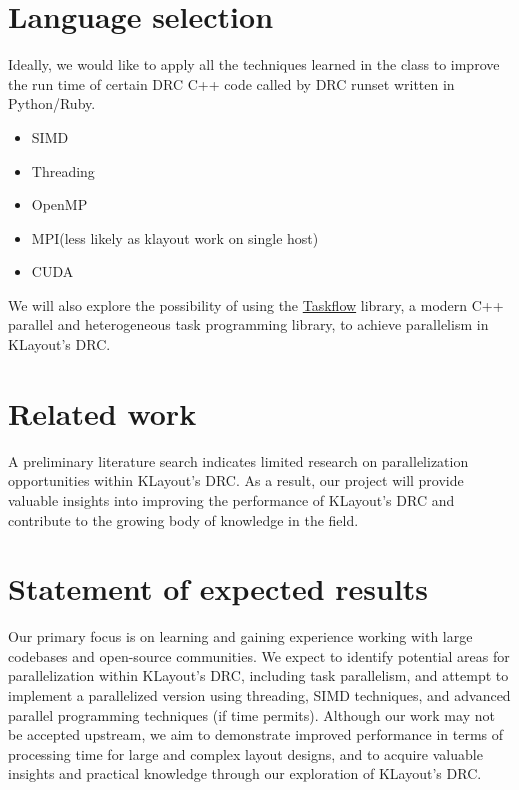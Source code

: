 \documentclass[sigconf]{acmart}
\begin{document}
\section{Language selection}
Ideally, we would like to apply all the techniques learned in the class to improve the run time of certain DRC C++ code called by DRC runset written in Python/Ruby.
\begin{itemize}
  \item SIMD
  \item Threading 
  \item OpenMP 
  \item MPI(less likely as klayout work on single host)
  \item CUDA
\end{itemize}
We will also explore the possibility of using the \href{https://taskflow.github.io/}{Taskflow} library, a modern C++ parallel and heterogeneous task programming library, to achieve parallelism in KLayout's DRC.

\section{Related work}
A preliminary literature search indicates limited research on parallelization opportunities within KLayout's DRC. As a result, our project will provide valuable insights into improving the performance of KLayout's DRC and contribute to the growing body of knowledge in the field.

\section{Statement of expected results}
Our primary focus is on learning and gaining experience working with large codebases and open-source communities. We expect to identify potential areas for parallelization within KLayout's DRC, including task parallelism, and attempt to implement a parallelized version using threading, SIMD techniques, and advanced parallel programming techniques (if time permits). Although our work may not be accepted upstream, we aim to demonstrate improved performance in terms of processing time for large and complex layout designs, and to acquire valuable insights and practical knowledge through our exploration of KLayout's DRC.
\end{document}
